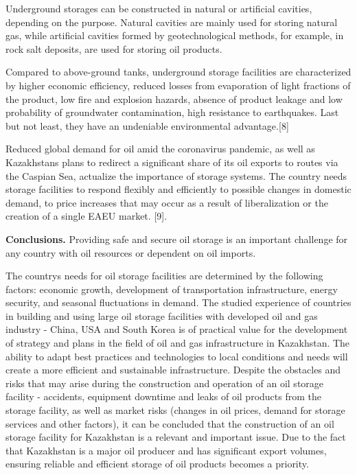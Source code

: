 Underground storages can be constructed in natural or artificial
cavities, depending on the purpose. Natural cavities are mainly used for
storing natural gas, while artificial cavities formed by
geotechnological methods, for example, in rock salt deposits, are used
for storing oil products.

Compared to above-ground tanks, underground storage facilities are
characterized by higher economic efficiency, reduced losses from
evaporation of light fractions of the product, low fire and explosion
hazards, absence of product leakage and low probability of groundwater
contamination, high resistance to earthquakes. Last but not least, they
have an undeniable environmental advantage.{[}8{]}

Reduced global demand for oil amid the coronavirus pandemic, as well as
Kazakhstan\textquotesingle s plans to redirect a significant share of
its oil exports to routes via the Caspian Sea, actualize the importance
of storage systems. The country needs storage facilities to respond
flexibly and efficiently to possible changes in domestic demand, to
price increases that may occur as a result of liberalization or the
creation of a single EAEU market. {[}9{]}.

{\bfseries Conclusions.} Providing safe and secure oil storage is an
important challenge for any country with oil resources or dependent on
oil imports.

The country\textquotesingle s needs for oil storage facilities are
determined by the following factors: economic growth, development of
transportation infrastructure, energy security, and seasonal
fluctuations in demand. The studied experience of countries in building
and using large oil storage facilities with developed oil and gas
industry - China, USA and South Korea is of practical value for the
development of strategy and plans in the field of oil and gas
infrastructure in Kazakhstan. The ability to adapt best practices and
technologies to local conditions and needs will create a more efficient
and sustainable infrastructure. Despite the obstacles and risks that may
arise during the construction and operation of an oil storage facility -
accidents, equipment downtime and leaks of oil products from the storage
facility, as well as market risks (changes in oil prices, demand for
storage services and other factors), it can be concluded that the
construction of an oil storage facility for Kazakhstan is a relevant and
important issue. Due to the fact that Kazakhstan is a major oil producer
and has significant export volumes, ensuring reliable and efficient
storage of oil products becomes a priority.

